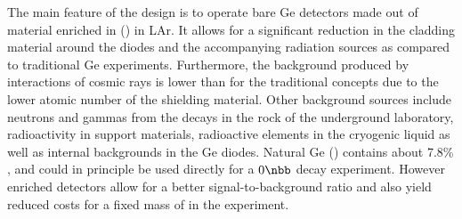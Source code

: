  The main feature of the {\gerda} design is to operate bare Ge detectors made out of material enriched in  () in LAr. It allows for a significant reduction in the cladding material around the diodes and the accompanying radiation sources as compared to traditional Ge experiments. Furthermore, the background produced by interactions of cosmic rays is lower than for the traditional concepts due to the lower atomic number of the shielding material. Other background sources include neutrons and gammas from the decays in the rock of the underground laboratory, radioactivity in support materials, radioactive elements in the cryogenic liquid as well as internal backgrounds in the Ge diodes. Natural Ge () contains about 7.8\% , and could in principle be used directly for a $0\nbb$ decay experiment. However enriched detectors allow for a better signal-to-background ratio and also yield reduced costs for a fixed mass of  in the experiment.
